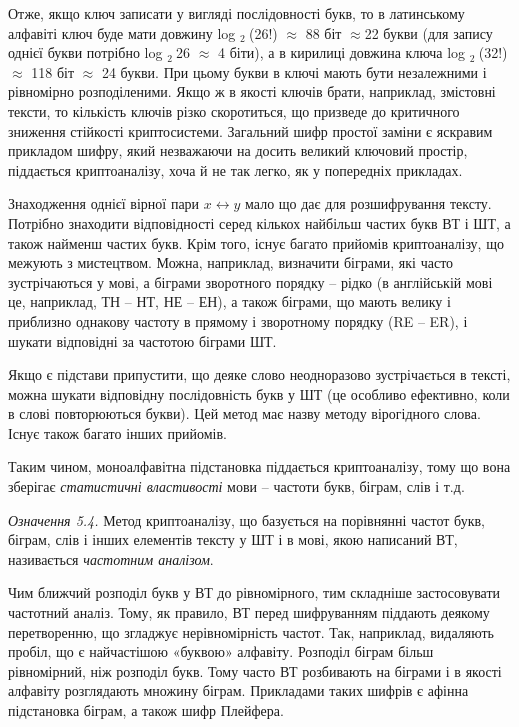 \documentclass[a4paper]{article}
\newcommand\textsubscript[1]{\ensuremath{{}_{\text{#1}}}}
\newcounter{}
\begin{document}
Отже, якщо ключ записати у вигляді послідовності букв, то в латинському алфавіті
ключ буде мати довжину  log \textsubscript{2 }(26!) ${\approx}$ 88 біт
${\approx}$22 букви  (для запису однієї букви потрібно log \textsubscript{2 }26
${\approx}$ 4 біти), а в кирилиці довжина ключа  log \textsubscript{2 }(32!)
${\approx}$ 118 біт ${\approx}$ 24 букви. При цьому букви в ключі мають бути
незалежними і рівномірно розподіленими. Якщо ж в якості ключів брати,
наприклад, змістовні тексти, то кількість ключів різко скоротиться, що призведе
до критичного зниження стійкості криптосистеми. Загальний шифр простої заміни є
яскравим прикладом шифру, який незважаючи на досить великий ключовий простір,
піддається криптоаналізу, хоча й не так легко, як у попередніх прикладах.

Знаходження однієї вірної пари   ${x\leftrightarrow y}$ мало що дає для
розшифрування тексту. Потрібно знаходити відповідності серед кількох найбільш
частих букв ВТ і ШТ, а також найменш частих букв. Крім того, існує багато
прийомів криптоаналізу, що межують з мистецтвом. Можна, наприклад, визначити
біграми, які часто зустрічаються у мові, а  біграми зворотного порядку – рідко
(в англійській мові це, наприклад, ТН – НТ, НЕ – ЕН), а також біграми, що мають
велику і приблизно однакову частоту в прямому і зворотному порядку (RE – ER), і
шукати відповідні за частотою  біграми ШТ.

Якщо є підстави припустити, що деяке слово неодноразово зустрічається в тексті,
можна шукати відповідну послідовність букв у ШТ (це особливо ефективно, коли в
слові повторюються букви). Цей метод має назву методу вірогідного слова. Існує
також багато інших прийомів.

Таким чином, моноалфавітна підстановка піддається криптоаналізу, тому що вона
зберігає \textit{статистичні властивості} мови – частоти букв, біграм, слів і
т.д.

\textit{Означення 5.4.}\textit{ }Метод криптоаналізу, що базується на порівнянні
частот букв, біграм, слів і інших елементів тексту у ШТ і в мові, якою
написаний ВТ, називається \textit{частотним аналізом}.

Чим ближчий розподіл букв у ВТ до рівномірного, тим складніше застосовувати
частотний аналіз. Тому, як правило, ВТ перед шифруванням піддають деякому
перетворенню, що згладжує нерівномірність частот. Так, наприклад, видаляють
пробіл, що є найчастішою «буквою» алфавіту. Розподіл біграм більш рівномірний,
ніж розподіл букв. Тому часто ВТ розбивають на біграми і в якості алфавіту
розглядають множину біграм. Прикладами таких шифрів є афінна підстановка
біграм, а також шифр Плейфера.
\end{document}
